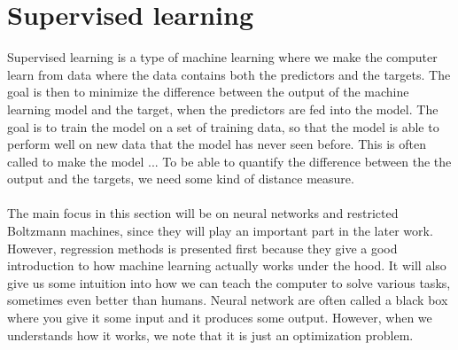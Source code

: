 \section{Supervised learning}
Supervised learning is a type of machine learning where we make the computer learn from data where the data contains both the predictors and the targets. The goal is then to minimize the difference between the output of the machine learning model and the target, when the predictors are fed into the model. The goal is to train the model on a set of training data, so that the model is able to perform well on new data that the model has never seen before. This is often called to make the model ... To be able to quantify the difference between the the output and the targets, we need some kind of distance measure.  
\\
\\
The main focus in this section will be on neural networks and restricted Boltzmann machines, since they will play an important part in the later work. However, regression methods is presented first because they give a good introduction to how machine learning actually works under the hood. It will also give us some intuition into how we can teach the computer to solve various tasks, sometimes even better than humans. Neural network are often called a black box where you give it some input and it produces some output. However, when we understands how it works, we note that it is just an optimization problem. 
\\
\\
 
